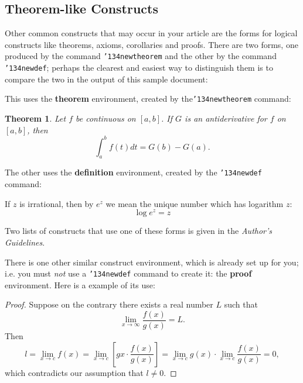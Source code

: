 \documentclass{style/nime-alternate}
\begin{document}
\subsection{Theorem-like Constructs}
Other common constructs that may occur in your article are
the forms for logical constructs like theorems, axioms,
corollaries and proofs.  There are
two forms, one produced by the
command \texttt{{\char'134}newtheorem} and the
other by the command \texttt{{\char'134}newdef}; perhaps
the clearest and easiest way to distinguish them is
to compare the two in the output of this sample document:

This uses the \textbf{theorem} environment, created by
the\linebreak\texttt{{\char'134}newtheorem} command:
\newtheorem{theorem}{Theorem}
\begin{theorem}
Let $f$ be continuous on $[a,b]$.  If $G$ is
an antiderivative for $f$ on $[a,b]$, then
\begin{displaymath}\int^b_af(t)dt = G(b) - G(a).\end{displaymath}
\end{theorem}

The other uses the \textbf{definition} environment, created
by the \texttt{{\char'134}newdef} command:
\begin{definition}
If $z$ is irrational, then by $e^z$ we mean the
unique number which has
logarithm $z$: \begin{displaymath}{\log e^z = z}\end{displaymath}
\end{definition}

Two lists of constructs that use one of these
forms is given in the
\textit{Author's  Guidelines}.
 
There is one other similar construct environment, which is
already set up
for you; i.e. you must \textit{not} use
a \texttt{{\char'134}newdef} command to
create it: the \textbf{proof} environment.  Here
is a example of its use:
\begin{proof}
Suppose on the contrary there exists a real number $L$ such that
\begin{displaymath}
\lim_{x\rightarrow\infty} \frac{f(x)}{g(x)} = L.
\end{displaymath}
Then
\begin{displaymath}
l=\lim_{x\rightarrow c} f(x)
= \lim_{x\rightarrow c}
\left[ g{x} \cdot \frac{f(x)}{g(x)} \right ]
= \lim_{x\rightarrow c} g(x) \cdot \lim_{x\rightarrow c}
\frac{f(x)}{g(x)} = 0,
\end{displaymath}
which contradicts our assumption that $l\neq 0$.
\end{proof}
\end{document}
